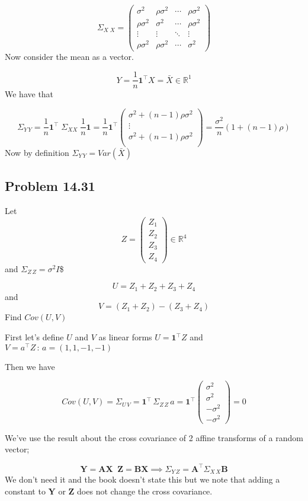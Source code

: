 \documentclass[12pt,]{article}
\begin{document}
\[\Sigma_{X \; X} = 
\left(\begin{array}{cccc}
\sigma^2 & \rho\sigma^2 & \cdots & \rho\sigma^2  \\
\rho\sigma^2 & \sigma^2 & \cdots & \rho\sigma^2  \\
\vdots & \vdots & \ddots & \vdots  \\
\rho\sigma^2 & \rho\sigma^2 & \cdots & \sigma^2 
\end{array}
\right)
\] Now consider the mean as a vector.

\[Y = \frac{1}{n} \textbf{1}^\intercal X = \bar{X} \in \mathbb{R}^1\] We
have that

\[\Sigma_{Y \, Y} = \frac{1}{n} \textbf{1}^\intercal \;\Sigma_{X  X} \;\frac{1}{n} \textbf{1} =
\frac{1}{n} \textbf{1}^\intercal 
\left(\begin{array}{c}
\sigma^2 + (n-1)\rho\sigma^2  \\
\vdots  \\
\sigma^2 + (n-1)\rho\sigma^2  \\
\end{array}
\right)=
\frac{\sigma^2}{n} (1 + (n-1)\rho)
\] Now by definition \(\Sigma_{Y \, Y}=Var(\bar{X})\)

\subsection{Problem 14.31}\label{problem-14.31}

Let \[Z= \left(\begin{array}{c}
Z_1  \\
Z_2  \\
Z_3  \\
Z_4  
\end{array}
\right)\in \mathbb{R}^4\] and \(\Sigma_{Z \, Z} = \sigma^2 I\)\$

\[U = Z_1 + Z_2 + Z_3 +Z_4\] and \[V= (Z_1+Z_2) - (Z_3 + Z_4)\] Find
\(Cov(U,V)\)

First let's define \(U\) and \(V\) as linear forms
\(U=\textbf{1}^\intercal Z\) and
\(V=a^\intercal Z \, : \, a=(1,1,-1,-1)\)

Then we have

\[Cov(U,V) = \Sigma_{U \, V} = \textbf{1}^\intercal \,  \Sigma_{Z \, Z}  \, a = \textbf{1}^\intercal 
\left(\begin{array}{c}
\sigma^2  \\
\sigma^2  \\
-\sigma^2  \\
-\sigma^2  
\end{array}
\right) =0\]

We've use the result about the cross covariance of 2 affine transforms
of a random vector;

\[\textbf{Y}= \textbf{A} \textbf{X} \;\; \textbf{Z}= \textbf{B} \textbf{X} \implies \Sigma_{Y \,Z} =\textbf{A}^\intercal \Sigma_{X \,X} \textbf{B} \]
We don't need it and the book doesn't state this but we note that adding
a constant to \(\textbf{Y}\) or \(\textbf{Z}\) does not change the cross
covariance.
\end{document}
